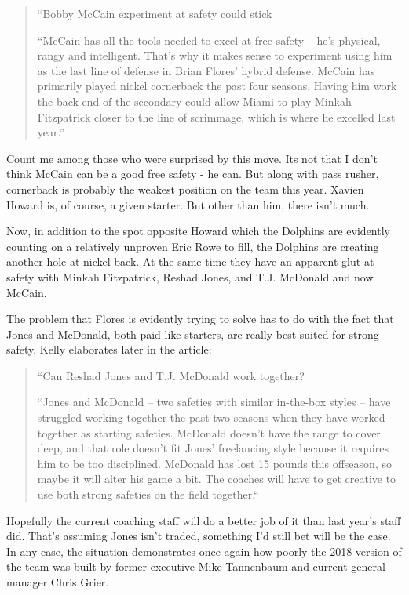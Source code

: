 \documentclass[11pt]{article}
\begin{document}
\begin{itemize}
\begin{quote}
  ``Bobby McCain experiment at safety could stick
  
``McCain has all the tools needed to excel at free safety -- he's physical, rangy and intelligent. That’s why it makes sense to experiment using him as the last line of defense in Brian Flores’ hybrid defense. McCain has primarily played nickel cornerback the past four seasons. Having him work the back-end of the secondary could allow Miami to play Minkah Fitzpatrick closer to the line of scrimmage, which is where he excelled last year.''
\end{quote}

Count me among those who were surprised by this move.  Its not that I don't think McCain can be a good free safety - he can.  But along with pass rusher, cornerback is probably the weakest position on the team this year.  Xavien Howard is, of course, a given starter.  But other than him, there isn't much.

Now, in addition to the spot opposite Howard which the Dolphins are evidently counting on a relatively unproven Eric Rowe to fill, the Dolphins are creating another hole at nickel back.  At the same time they have an apparent glut at safety with Minkah Fitzpatrick, Reshad Jones, and T.J. McDonald and now McCain.

The problem that Flores is evidently trying to solve has to do with the fact that Jones and McDonald, both paid like starters, are really best suited for strong safety.  Kelly elaborates later in the article:

\begin{quote}
``Can Reshad Jones and T.J. McDonald work together?

``Jones and McDonald -- two safeties with similar in-the-box styles -- have struggled working together the past two seasons when they have worked together as starting safeties. McDonald doesn’t have the range to cover deep, and that role doesn’t fit Jones’ freelancing style because it requires him to be too disciplined. McDonald has lost 15 pounds this offseason, so maybe it will alter his game a bit. The coaches will have to get creative to use both strong safeties on the field together.``
\end{quote}

Hopefully the current coaching staff will do a better job of it than last year's staff did.  That's assuming Jones isn't traded, something I'd still bet will be the case.  In any case, the situation demonstrates once again how poorly the 2018 version of the team was built by former executive Mike Tannenbaum and current general manager Chris Grier.


\end{itemize}
\end{document}
